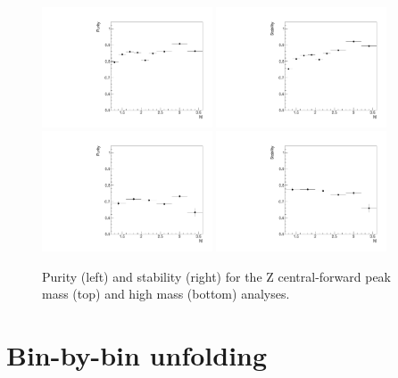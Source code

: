 \begin{figure}
  \centering
  \includegraphics[width=0.45\textwidth]{figures/ZCF_purity_peak}
  \includegraphics[width=0.45\textwidth]{figures/ZCF_stability_peak} \\
  \includegraphics[width=0.45\textwidth]{figures/ZCF_purity_high}
  \includegraphics[width=0.45\textwidth]{figures/ZCF_stability_high} \\
  \caption{Purity (left) and stability (right) for the Z central-forward peak mass (top) and high mass (bottom) analyses.}
  \label{fig:ZeeCS_purity_stability}
\end{figure}

\section{Bin-by-bin unfolding}

